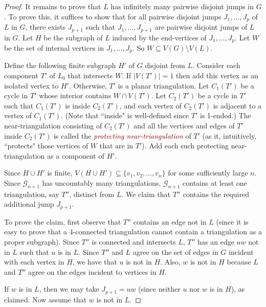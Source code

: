 \documentclass[a4paper,11pt]{article}
\newcommand{\defn}[1]{\textcolor{Maroon}{\emph{#1}}\index{#1}}
\theoremstyle{plain}
\theoremstyle{definition}
\newcommand{\GG}{\mathcal{G}}
\begin{document}
\begin{proof}
It remains to prove that $L$ has infinitely many pairwise disjoint jumps in $G$.  To prove this, it suffices to show that for all pairwise disjoint jumps $J_1, \dots ,J_p$ of $L$ in $G$, there exists $J_{p+1}$ such that $J_1, \dots, J_{p+1}$ are pairwise disjoint jumps of $L$ in $G$. 
Let $H$ be the subgraph of $L$ induced by the end-vertices of $J_1,\dots,J_p$. 
Let $W$ be the set of internal vertices in $J_1,\dots,J_p$. So $W\subseteq V(G)\setminus V(L)$. 

Define the following finite subgraph $H'$ of $G$ disjoint from $L$. Consider each component $T'$ of $L_0$ that intersects $W$. If $|V(T')|=1$ then add this vertex as an isolated vertex to $H'$. Otherwise, $T'$ is a planar triangulation. Let $C_1(T')$ be a cycle in $T'$ whose interior contains $W\cap V(T')$. Let $C_2(T')$  be a cycle in $T'$ such that $C_1(T')$ is inside $C_2(T')$, and each vertex of $C_2(T')$ is adjacent to a vertex of $C_1(T')$. (Note that ``inside" is well-defined since $T'$ is 1-ended.) The near-triangulation consisting of $C_2(T')$ and all the vertices and edges of $T'$ inside $C_2(T')$ is called the \defn{protecting near-triangulation} of $T'$ (as it, intuitively, ``protects" those vertices of $W$ that are in $T'$). Add each such protecting near-triangulation as a component of $H'$.

Since $H\cup H'$ is finite, $V(H\cup H') \subseteq \{v_1,v_2, \dots ,v_n\}$ for some sufficiently large $n$. Since $\GG_{n+1}$ has uncountably many triangulations, $\GG_{n+1}$ contains at least one triangulation, say $T''$, distinct from $L$. We claim that $T''$ contains the required additional jump $J_{p+1}$.

To prove the claim, first observe that $T''$ contains an edge not in $L$ (since it is easy to prove that a 4-connected triangulation cannot contain a triangulation as a proper subgraph). Since $T''$ is connected and intersects $L$, $T''$ has an edge $uw$ not in $L$ such that $u$ is in $L$. Since $T''$ and $L$ agree on the set of edges in $G$ incident with each vertex in $H$, we have that $u$ is not in $H$. Also, $w$ is not in $H$ because $L$ and $T''$ agree on the edges incident to  vertices in $H$. 

If  $w$ is in $L$, then we may take $J_{p+1}=uw$ (since neither $u$ nor $w$ is in $H$), as claimed. Now assume that $w$ is not in $L$. 


\end{proof}
\end{document}
